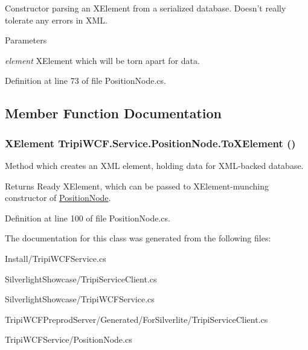 Constructor parsing an XElement from a serialized database. Doesn't really tolerate any errors in XML. 
\begin{DoxyParams}{Parameters}
\item[{\em element}]XElement which will be torn apart for data.\end{DoxyParams}


Definition at line 73 of file PositionNode.cs.

\subsection{Member Function Documentation}
\hypertarget{class_tripi_w_c_f_1_1_service_1_1_position_node_a229145b100cc00adfc119f4b254eb8e7}{
\subsubsection[{ToXElement}]{\setlength{\rightskip}{0pt plus 5cm}XElement TripiWCF.Service.PositionNode.ToXElement ()}}
\label{class_tripi_w_c_f_1_1_service_1_1_position_node_a229145b100cc00adfc119f4b254eb8e7}


Method which creates an XML element, holding data for XML-\/backed database. \begin{DoxyReturn}{Returns}
Ready XElement, which can be passed to XElement-\/munching constructor of \hyperlink{class_tripi_w_c_f_1_1_service_1_1_position_node}{PositionNode}.
\end{DoxyReturn}


Definition at line 100 of file PositionNode.cs.

The documentation for this class was generated from the following files:\begin{DoxyCompactItemize}
\item 
Install/TripiWCFService.cs\item 
SilverlightShowcase/TripiServiceClient.cs\item 
SilverlightShowcase/TripiWCFService.cs\item 
TripiWCFPreprodServer/Generated/ForSilverlite/TripiServiceClient.cs\item 
TripiWCFService/PositionNode.cs\end{DoxyCompactItemize}
